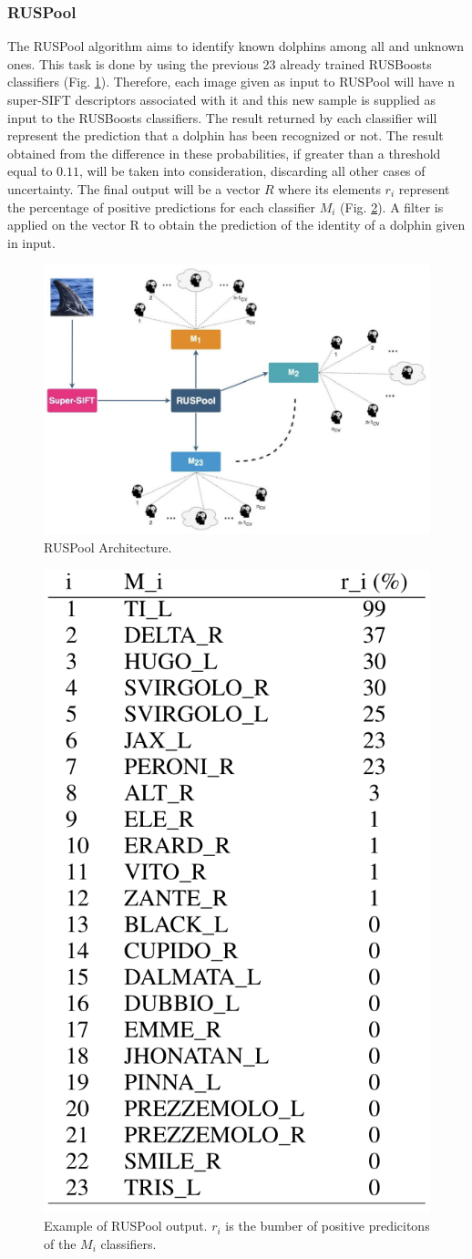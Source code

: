 \subsubsection{RUSPool}
The RUSPool algorithm aims to identify known dolphins among all and unknown 
ones. This task is done by using the previous 23 already trained 
RUSBoosts classifiers (Fig. \ref{fig:RUSPool Arch}). Therefore, each image given as input to RUSPool 
will have n super-SIFT descriptors associated with it and this new sample is 
supplied as input to the RUSBoosts classifiers. The result returned by each 
classifier will represent the prediction that a dolphin has been recognized or 
not. The result obtained from the difference in these probabilities, if greater 
than a threshold equal to $0.11$, will be taken into consideration, discarding 
all other cases of uncertainty. The final output will be a vector $R$ where its 
elements $r_i$ represent the percentage of positive predictions for each classifier 
$M_i$ (Fig. \ref{fig:ri}). A filter is applied on the vector R to obtain the 
prediction of the identity of a dolphin given in input.
\begin{figure}[h!]
    \centering
    \includegraphics[width = 0.5\linewidth]{images/paper10/RUSPool Architecture.png}
    \centering
    \caption{RUSPool Architecture.}
    \label{fig:RUSPool Arch}
\end{figure}
\begin{figure}[h!]
    \centering
    \includegraphics[width = 0.4\linewidth]{images/paper10/ri.png}
    \centering
    \caption{Example of RUSPool output. $r_i$ is the bumber of positive predicitons of the $M_i$ classifiers.}
    \label{fig:ri}
\end{figure}

